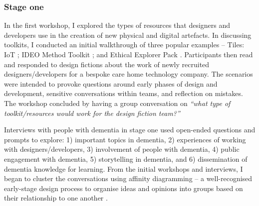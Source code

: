 \subsubsection{Stage one}
In the first workshop, I explored the types of resources that designers and developers use in the creation of new physical and digital artefacts. In discussing toolkits, I conducted an initial walkthrough of three popular examples – Tiles: IoT \citep{mora2017tiles}; IDEO Method Toolkit \citep{fraga2020inclusive}; and Ethical Explorer Pack \citep{network_ethical_nodate}. Participants then read and responded to design fictions about the work of newly recruited designers/developers for a bespoke care home technology company. The scenarios were intended to provoke questions around early phases of design and development, sensitive conversations within teams, and reflection on mistakes. The workshop concluded by having a group conversation on \textit{``what type of toolkit/resources would work for the design fiction team?''}

Interviews with people with dementia in stage one used open-ended questions and prompts to explore: 1) important topics in dementia, 2) experiences of working with designers/developers, 3) involvement of people with dementia, 4) public engagement with dementia, 5) storytelling in dementia, and 6) dissemination of dementia knowledge for learning. From the initial workshops and interviews, I began to cluster the conversations using affinity diagramming – a well-recognised early-stage design process to organise ideas and opinions into groups based on their relationship to one another \citep{lucero2015using}. 


